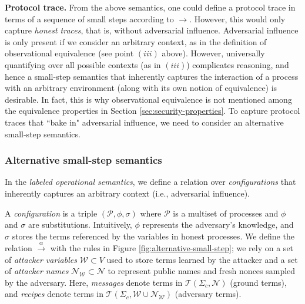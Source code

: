 \documentclass{article}
\theoremstyle{definition}
\begin{document}
\textbf{Protocol trace.} 
From the above semantics, one could define a protocol trace in terms of a sequence of small steps according to $\rightarrow$. However, this would only capture \textit{honest traces}, that is, without adversarial influence. Adversarial influence is only present if we consider an arbitrary context, as in the definition of observational equivalence (see point $(iii)$ above). However, universally quantifying over all possible contexts (as in $(iii)$) complicates reasoning, and hence a small-step semantics that inherently captures the interaction of a process with an arbitrary environment (along with its own notion of equivalence) is desirable. In fact, this is why observational equivalence is not mentioned among the equivalence properties in Section \ref{sec:security-properties}. To capture protocol traces that ``bake in" adversarial influence, we need to consider an alternative small-step semantics. 

\subsubsection{Alternative small-step semantics}\label{sec:alternative}
In the \emph{labeled operational semantics}, we define a relation over \emph{configurations} that inherently captures an arbitrary context (i.e., adversarial influence).

A \emph{configuration} is a triple $(\mathcal{P}, \phi, \sigma)$ where $\mathcal{P}$ is a multiset of processes 
and $\phi$ and $\sigma$ are substitutions.  
Intuitively, $\phi$ represents the adversary's knowledge, and $\sigma$ stores the terms referenced 
by the variables in honest processes. 
We define the relation $\xrightarrow{\alpha}$ with the rules in Figure \ref{fig:alternative-small-step}; 
we rely on a set of \emph{attacker variables} $\mathcal{W} \subset V$ used to store terms learned
by the attacker and a set of \emph{attacker names} $\mathcal{N}_{\mathcal{W}} \subset \mathcal{N}$ 
to represent public names and fresh nonces sampled by the adversary. 
Here, \emph{messages} denote terms in $\mathcal{T}(\Sigma_c, \mathcal{N})$ (ground terms), 
and \emph{recipes} denote terms in $\mathcal{T}(\Sigma_c, \mathcal{W} \cup \mathcal{N}_{\mathcal{W}})$ (adversary terms).
\end{document}
